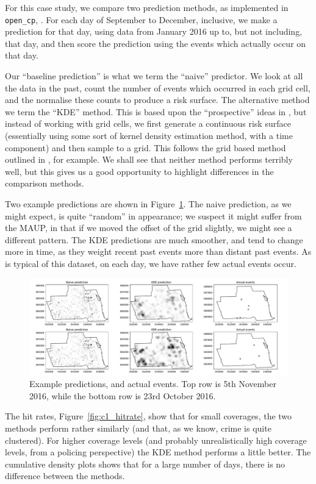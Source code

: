\documentclass[twoside,a4paper,twocolumn,10pt]{article}
\theoremstyle{plain}
\theoremstyle{definition}
\begin{document}
For this case study, we compare two prediction methods, as implemented in \texttt{open\_cp},
\cite{opencp}.  For each day of September to December, inclusive,
we make a prediction for that day, using data from January 2016 up to, but not including,
that day, and then score the prediction using the events which actually occur on that day.

Our ``baseline prediction'' is what we term the ``naive'' predictor.  We look at all the data
in the past, count the number of events which occurred in each grid cell, and the normalise these
counts to produce a risk surface.  The alternative method we term the ``KDE'' method.  This is
based upon the ``prospective'' ideas in \cite{bjp}, but instead of working with grid cells,
we first generate a continuous risk surface (essentially using some sort of kernel density
estimation method, with a time component) and then sample to a grid.  This follows the
grid based method outlined in \cite{rdbjc}, for example.  We shall see that
neither method performs terribly well, but this gives us a good opportunity to highlight
differences in the comparison methods.

Two example predictions are shown in Figure~\ref{fig:c1_preds}.  The naive prediction, as we
might expect, is quite ``random'' in appearance; we suspect it might suffer from the MAUP,
in that if we moved the offset of the grid slightly, we might see a different pattern.
The KDE predictions are much smoother, and tend to change more in time, as they weight
recent past events more than distant past events.  As is typical of this dataset, on each
day, we have rather few actual events occur.

\begin{figure}
	\includegraphics[width=\textwidth]{../details/northside_preds.pdf}
  \caption{Example predictions, and actual events.  Top row is 5th November 2016, while
the bottom row is 23rd October 2016.}
   \label{fig:c1_preds}
\end{figure}
	
The hit rates, Figure~\ref{fig:c1_hitrate}, show that for small coverages, the two methods
perform rather similarly (and that, as we know, crime is quite clustered).  For higher
coverage levels (and probably unrealistically
high coverage levels, from a policing perspective) the KDE method performs a little better.  The
cumulative density plots shows that for a large number of days, there is no difference between
the methods.
\end{document}

